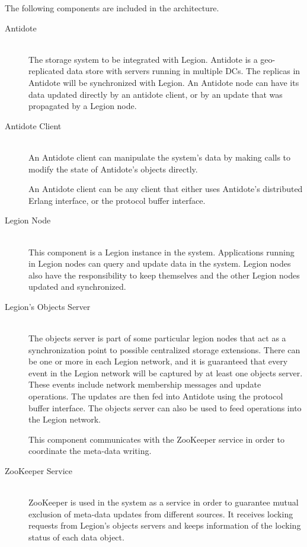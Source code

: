 \par
	The following components are included in the architecture.
\begin{description}

\item[Antidote] \hfill \\
The storage system to be integrated with Legion. Antidote is a geo-replicated data store with servers running in multiple DCs. The replicas in Antidote will be synchronized with Legion. An Antidote node can have its data updated directly by an antidote client, or by an update that was propagated by a Legion node.\par

\item[Antidote Client] \hfill \\
An Antidote client can manipulate the system's data by making calls to modify the state of Antidote's objects directly.\par
	An Antidote client can be any client that either uses Antidote's distributed Erlang interface, or the protocol buffer interface.


\item[Legion Node] \hfill \\
This component is a Legion instance in the system. Applications running in Legion nodes can query and update data in the system. Legion nodes also have the responsibility to keep themselves and the other Legion nodes updated and synchronized.


\item[Legion's Objects Server] \hfill \\
The objects server is part of some particular legion nodes that act as a synchronization point to possible centralized storage extensions. There can be one or more in each Legion network, and it is guaranteed that every event in the Legion network will be captured by at least one objects server. These events include network membership messages and update operations. The updates are then fed into Antidote using the protocol buffer interface. The objects server can also be used to feed operations into the Legion network.\par
	This component communicates with the ZooKeeper service in order to coordinate the meta-data writing.

\item[ZooKeeper Service] \hfill \\
ZooKeeper is used in the system as a service in order to guarantee mutual exclusion of meta-data updates from different sources. It receives locking requests from Legion's objects servers and keeps information of the locking status of each data object.

\end{description}


